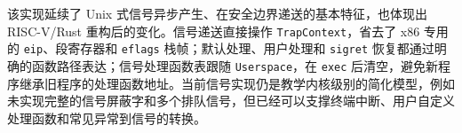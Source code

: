 该实现延续了 Unix 式信号异步产生、在安全边界递送的基本特征，也体现出 RISC-V/Rust 重构后的变化。信号递送直接操作 \verb|TrapContext|，省去了 x86 专用的 \verb|eip|、段寄存器和 \verb|eflags| 栈帧；默认处理、用户处理和 \verb|sigret| 恢复都通过明确的函数路径表达；信号处理函数表跟随 \verb|Userspace|，在 \verb|exec| 后清空，避免新程序继承旧程序的处理函数地址。当前信号实现仍是教学内核级别的简化模型，例如未实现完整的信号屏蔽字和多个排队信号，但已经可以支撑终端中断、用户自定义处理函数和常见异常到信号的转换。
